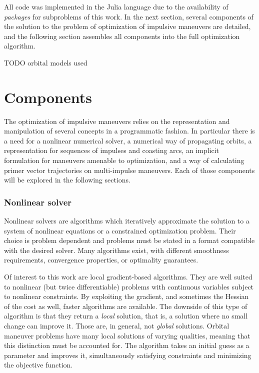 
All code was implemented in the Julia language due to the availability of \textit{packages} for subproblems of this work. In the next section, several components of the solution to the problem of optimization of impulsive maneuvers are detailed, and the following section assembles all components into the full optimization algorithm.

TODO orbital models used

\section{Components}

The optimization of impulsive maneuvers relies on the representation and manipulation of several concepts in a programmatic fashion. In particular there is a need for a nonlinear numerical solver, a numerical way of propagating orbits, a representation for sequences of impulses and coasting arcs, an implicit formulation for maneuvers amenable to optimization, and a way of calculating primer vector trajectories on multi-impulse maneuvers. Each of those components will be explored in the following sections.

\subsubsection{Nonlinear solver}\label{sssec:solver}

Nonlinear solvers are algorithms which iteratively approximate the solution to a system of nonlinear equations or a constrained optimization problem. Their choice is problem dependent and problems must be stated in a format compatible with the desired solver. Many algorithms exist, with different smoothness requirements, convergence properties, or optimality guarantees. 

Of interest to this work are local gradient-based algorithms. They are well suited to nonlinear (but twice differentiable) problems with continuous variables subject to nonlinear constraints. By exploiting the gradient, and sometimes the Hessian of the cost as well, faster algorithms are available. The downside of this type of algorithm is that they return a \textit{local} solution, that is, a solution where no small change can improve it. Those are, in general, not \textit{global} solutions. Orbital maneuver problems have many local solutions of varying qualities, meaning that this distinction must be accounted for. The algorithm takes an initial guess as a parameter and improves it, simultaneously satisfying constraints and minimizing the objective function.

